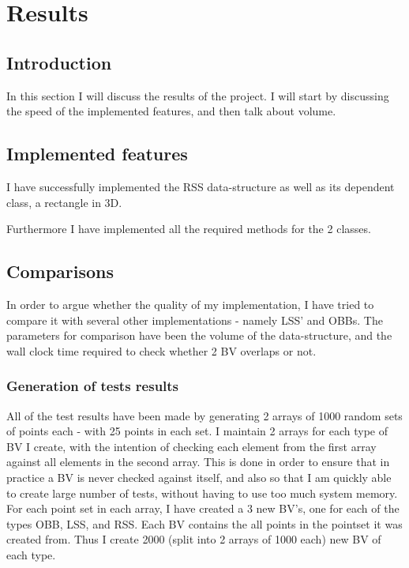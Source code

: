 
\section{Results}
\label{results}
\subsection{Introduction}
In this section I will discuss the results of the project. I will start by discussing the speed of the implemented features, and then talk about volume.

\subsection{Implemented features}
I have successfully implemented the RSS data-structure as well as its dependent class, a rectangle in 3D. 

Furthermore I have implemented all the required methods for the 2 classes.

\subsection{Comparisons}

In order to argue whether the quality of my implementation, I have tried to compare it with several other implementations - namely LSS' and OBBs. The parameters for comparison have been the volume of the data-structure, and the wall clock time required to check whether 2 BV overlaps or not.

\subsubsection{Generation of tests results}
All of the test results have been made by generating 2 arrays of
1000 random sets of points each - with 25 points in each set. I
maintain 2 arrays for each type of BV I create, with the intention of
checking each element from the first array against all elements in the
second array. This is done in order to ensure
that in practice a BV is never checked against itself, and also so
that I am quickly able to create large number of tests, without having
to use too much system memory. \\ 

For each point set in each array, I have created a 3 new BV's, one for
each of the types OBB, LSS, and RSS. Each BV contains the all points
in the pointset it was created from. Thus I create 2000 (split into 2 arrays of 1000 each)
new BV of each type. \\ 

